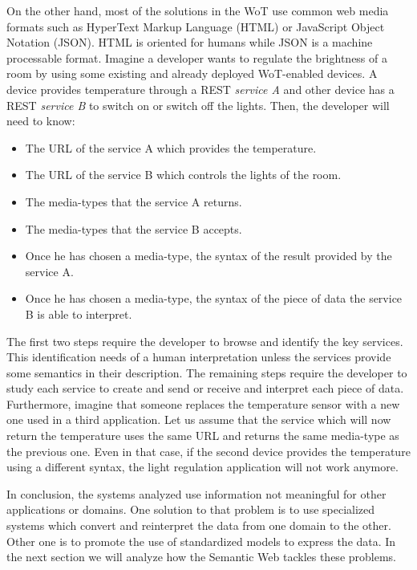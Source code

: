 \medskip

On the other hand, most of the solutions in the WoT use common web media formats such as HyperText Markup Language (HTML) or JavaScript Object Notation (JSON). %
HTML is oriented for humans while JSON is a machine processable format.
Imagine a developer wants to regulate the brightness of a room by using some existing and already deployed WoT-enabled devices.
A device provides temperature through a REST \emph{service A} and other device has a REST \emph{service B} to switch on or switch off the lights.
Then, the developer will need to know:
\begin{itemize}
 \item The URL of the service A which provides the temperature.
 \item The URL of the service B which controls the lights of the room.
 \item The media-types that the service A returns.
 \item The media-types that the service B accepts.
 \item Once he has chosen a media-type, the syntax of the result provided by the service A.
 \item Once he has chosen a media-type, the syntax of the piece of data the service B is able to interpret.
\end{itemize}

The first two steps require the developer to browse and identify the key services.
This identification needs of a human interpretation unless the services provide some semantics in their description. %
The remaining steps require the developer to study each service to create and send or receive and interpret each piece of data.
Furthermore, imagine that someone replaces the temperature sensor with a new one used in a third application.
Let us assume that the service which will now return the temperature uses the same URL and returns the same media-type as the previous one.
Even in that case, if the second device provides the temperature using a different syntax, the light regulation application will not work anymore.

\medskip


In conclusion, the systems analyzed use information not meaningful for other applications or domains.
One solution to that problem is to use specialized systems which convert and reinterpret the data from one domain to the other.
Other one is to promote the use of standardized models to express the data.
In the next section we will analyze how the Semantic Web tackles these problems.


